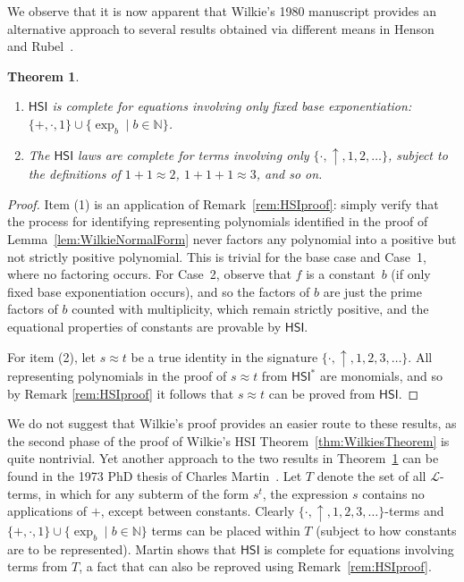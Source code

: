 \documentclass[eqnor,reqno]{amsart}
\theoremstyle{plain}
\newtheorem{thm}{Theorem}[section]
\theoremstyle{definition}
\newcommand{\HSI}{\textsf{HSI}}
\begin{document}
We observe that it is now apparent that Wilkie's 1980 manuscript provides an alternative approach to several results obtained via different means in Henson and Rubel~\cite{henrub}.
\begin{thm}\label{thm:fbHR}
\begin{enumerate}
\item 
$\HSI$  is complete for equations involving only fixed base exponentiation: $\{ +,\cdot, 1\}\cup\{\exp_b\mid b\in \mathbb{N}\}$.
\item The $\HSI$ laws are complete for terms involving only  $\{ \cdot, \uparrow, 1,2,\dots\}$, subject to the definitions of $1+1\approx 2$, $1+1+1\approx 3$, and so on.  
\end{enumerate}
\end{thm}
\begin{proof}
Item (1) 
 is an application of Remark~\ref{rem:HSIproof}: simply verify that the process for identifying representing polynomials identified in the proof of Lemma~\ref{lem:WilkieNormalForm} never factors any polynomial into a positive but not strictly positive polynomial.  
 This is trivial for the base case and Case~1, where no factoring occurs.  
 For Case~2, observe that $f$ is a constant~$b$ (if only fixed base exponentiation occurs), and so the factors of $b$ are just the prime factors of $b$ counted with multiplicity, which remain strictly positive, and the equational properties of constants are provable by $\HSI$. 
 
 For item (2), let $s\approx t$ be a true identity in the signature $\{\cdot, \uparrow ,1,2,3,\dots\}$.  
 All representing polynomials in the proof of $s\approx t$ from $\HSI^*$ are monomials, and so by Remark \ref{rem:HSIproof} it follows that $s\approx t$ can be proved from $\HSI$.  
\end{proof}
We do not suggest that Wilkie's proof provides an easier route to these results, as the second phase of the proof of Wilkie's HSI Theorem~\ref{thm:WilkiesTheorem} is quite nontrivial.
Yet another approach to the two results in Theorem~\ref{thm:fbHR} can be found in the 1973 PhD thesis of Charles Martin~\cite{mar}.  
Let $T$ denote the set of all $\mathscr{L}$-terms, in which for any subterm of the form $s^t$, the expression $s$ contains no applications of $+$, except between constants.  
Clearly $\{ \cdot, \uparrow , 1,2,3,\dots\}$-terms and $\{ +,\cdot, 1\}\cup\{\exp_b\mid b\in \mathbb{N}\}$ terms can be placed within $T$ (subject to how constants are to be represented).  
Martin shows that $\HSI$ is complete for equations involving terms from $T$, a fact that can also be reproved using Remark~\ref{rem:HSIproof}.
\end{document}
